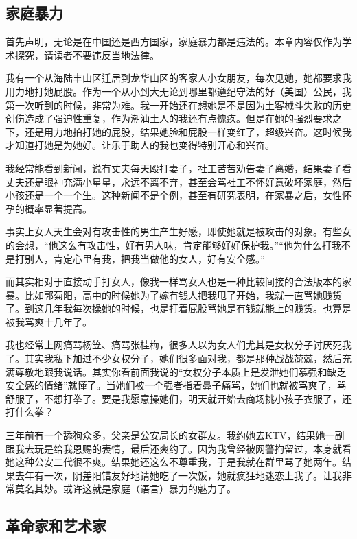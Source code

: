 \subsection{家庭暴力}

首先声明，无论是在中国还是西方国家，家庭暴力都是违法的。本章内容仅作为学术探究，请读者不要违反当地法律。

我有一个从海陆丰山区迁居到龙华山区的客家人小女朋友，每次见她，她都要求我用力地打她屁股。作为一个从小到大无论到哪里都遵纪守法的好（美国）公民，我第一次听到的时候，非常为难。我一开始还在想她是不是因为土客械斗失败的历史创伤造成了强迫性重复，作为潮汕土人的我还有点愧疚。但是在她的强烈要求之下，还是用力地拍打她的屁股，结果她脸和屁股一样变红了，超级兴奋。这时候我才知道打她是为她好。让乐于助人的我也变得特别开心和兴奋。

我经常能看到新闻，说有丈夫每天殴打妻子，社工苦苦劝告妻子离婚，结果妻子看丈夫还是眼神充满小星星，永远不离不弃，甚至会骂社工不怀好意破坏家庭，然后小孩还是一个一个生。这种新闻不是个例，甚至有研究表明，在家暴之后，女性怀孕的概率显著提高。

事实上女人天生会对有攻击性的男生产生好感，即使她就是被攻击的对象。有些女的会想，``他这么有攻击性，好有男人味，肯定能够好好保护我。''``他为什么打我不是打别人，肯定心里有我，把我当做他的女人，好有安全感。''

而其实相对于直接动手打女人，像我一样骂女人也是一种比较间接的合法版本的家暴。比如郭菊阳，高中的时候她为了嫁有钱人把我甩了开始，我就一直骂她贱货了。到这几年我每次操她的时候，也是打着屁股骂她是有钱就能上的贱货。也算是被我骂爽十几年了。

我也经常上网痛骂杨笠、痛骂张桂梅，很多人以为女人们尤其是女权分子讨厌死我了。其实我私下加过不少女权分子，她们很多面对我，都是那种战战兢兢，然后充满尊敬地跟我说话。其实你看前面我说的``女权分子本质上是发泄她们慕强和缺乏安全感的情绪''就懂了。当她们被一个强者指着鼻子痛骂，她们也就被骂爽了，骂舒服了，不想打拳了。要是我愿意操她们，明天就开始去商场挑小孩子衣服了，还打什么拳？

三年前有一个舔狗众多，父亲是公安局长的女群友。我约她去KTV，结果她一副跟我去玩是给我恩赐的表情，最后还爽约了。因为我曾经被网警拘留过，本身就看她这种公安二代很不爽。结果她还这么不尊重我，于是我就在群里骂了她两年。结果去年有一次，阴差阳错友好地请她吃了一次饭，她就疯狂地迷恋上我了。让我非常莫名其妙。或许这就是家庭（语言）暴力的魅力了。

\subsection{革命家和艺术家}

